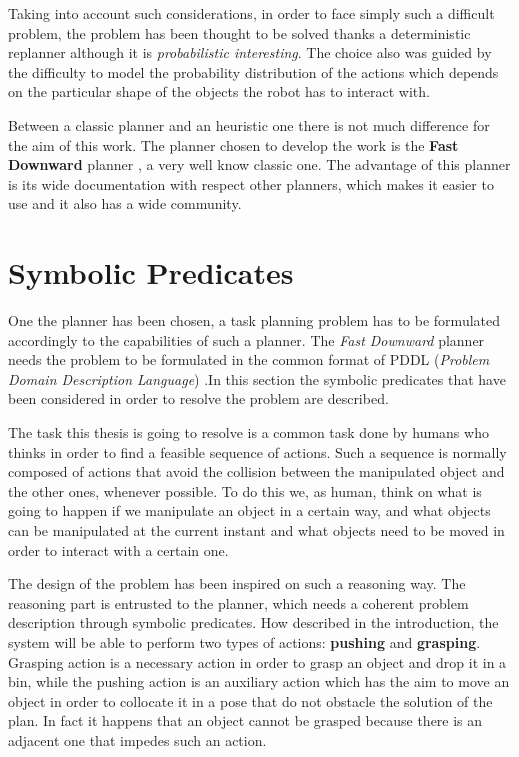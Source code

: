 Taking into account such considerations, in order to face simply such a difficult problem, the problem has been thought to be solved thanks a deterministic replanner although it is \textit{probabilistic interesting}. The choice also was guided by the difficulty to model the probability distribution of the actions which depends on the particular shape of the objects the robot has to interact with. 

Between a classic planner and an heuristic one there is not much difference for the aim of this work.
The planner chosen to develop the work is the \textbf{Fast Downward} planner \cite{helmert2006fast}\cite{FastDownwardPage}, a very well know classic one. The advantage of this planner is its wide documentation with respect other planners, which makes it easier to use and it also has a wide community. 

\section{Symbolic Predicates}
One the planner has been chosen, a task planning problem has to be formulated accordingly to the capabilities of such a planner. The \textit{Fast Downward} planner needs the problem to be formulated in the common format of PDDL (\textit{Problem Domain Description Language}) \citep{pddl}.In this section the symbolic predicates that have been considered in order to resolve the problem are described.

The task this thesis is going to resolve is a common task done by humans who thinks in order to find a feasible sequence of actions. Such a sequence is normally composed of actions that avoid the collision between the manipulated object and the other ones, whenever possible. To do this we, as human, think on what is going to happen if we manipulate an object in a certain way, and what objects can be manipulated at the current instant and what objects need to be moved in order to interact with a certain one.  

The design of the problem has been inspired on such a reasoning way. The reasoning part is entrusted to the planner, which needs a coherent problem description through symbolic predicates. How described in the introduction, the system will be able to perform two types of actions: \textbf{pushing} and \textbf{grasping}.
Grasping action is a necessary action in order to grasp an object and drop it in a bin, while the pushing action is an auxiliary action which has the aim to move an object in order to collocate it in a pose that do not obstacle the solution of the plan. In fact it happens that an object cannot be grasped because there is an adjacent one that impedes such an action.  

